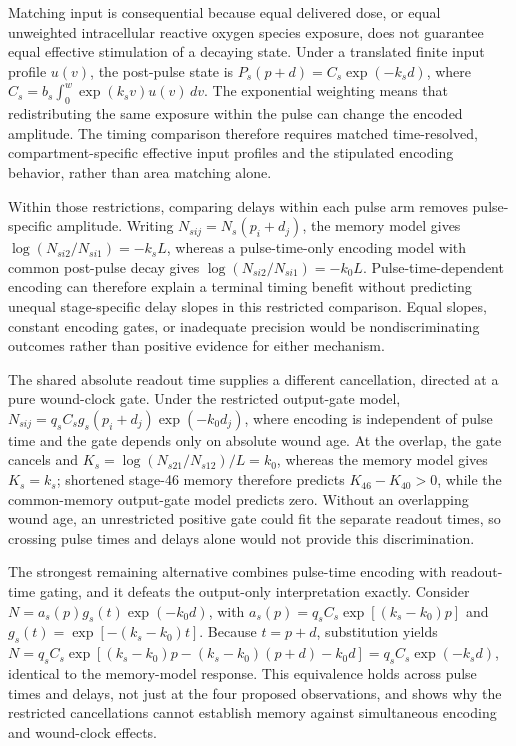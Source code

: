 \documentclass[11pt]{article}
\begin{document}
Matching input is consequential because equal delivered dose, or equal unweighted intracellular reactive oxygen species exposure, does not guarantee equal effective stimulation of a decaying state. Under a translated finite input profile $u(v)$, the post-pulse state is $P_s(p+d)=C_s\exp(-k_sd)$, where $C_s=b_s\int_0^w\exp(k_sv)u(v)\,dv$. The exponential weighting means that redistributing the same exposure within the pulse can change the encoded amplitude. The timing comparison therefore requires matched time-resolved, compartment-specific effective input profiles and the stipulated encoding behavior, rather than area matching alone.

Within those restrictions, comparing delays within each pulse arm removes pulse-specific amplitude. Writing $N_{sij}=N_s(p_i+d_j)$, the memory model gives $\log(N_{si2}/N_{si1})=-k_sL$, whereas a pulse-time-only encoding model with common post-pulse decay gives $\log(N_{si2}/N_{si1})=-k_0L$. Pulse-time-dependent encoding can therefore explain a terminal timing benefit without predicting unequal stage-specific delay slopes in this restricted comparison. Equal slopes, constant encoding gates, or inadequate precision would be nondiscriminating outcomes rather than positive evidence for either mechanism.

The shared absolute readout time supplies a different cancellation, directed at a pure wound-clock gate. Under the restricted output-gate model, $N_{sij}=q_sC_sg_s(p_i+d_j)\exp(-k_0d_j)$, where encoding is independent of pulse time and the gate depends only on absolute wound age. At the overlap, the gate cancels and $K_s=\log(N_{s21}/N_{s12})/L=k_0$, whereas the memory model gives $K_s=k_s$; shortened stage-46 memory therefore predicts $K_{46}-K_{40}>0$, while the common-memory output-gate model predicts zero. Without an overlapping wound age, an unrestricted positive gate could fit the separate readout times, so crossing pulse times and delays alone would not provide this discrimination.

The strongest remaining alternative combines pulse-time encoding with readout-time gating, and it defeats the output-only interpretation exactly. Consider $N=a_s(p)g_s(t)\exp(-k_0d)$, with $a_s(p)=q_sC_s\exp[(k_s-k_0)p]$ and $g_s(t)=\exp[-(k_s-k_0)t]$. Because $t=p+d$, substitution yields $N=q_sC_s\exp[(k_s-k_0)p-(k_s-k_0)(p+d)-k_0d]=q_sC_s\exp(-k_sd)$, identical to the memory-model response. This equivalence holds across pulse times and delays, not just at the four proposed observations, and shows why the restricted cancellations cannot establish memory against simultaneous encoding and wound-clock effects.
\end{document}

